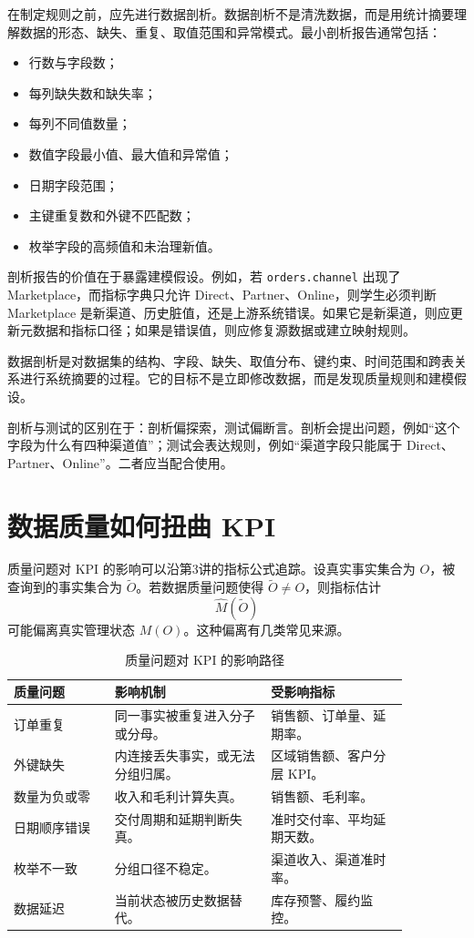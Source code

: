 \documentclass[UTF8,fontset=fandol,openany,zihao=-4]{ctexbook}
\begin{document}
在制定规则之前，应先进行数据剖析。数据剖析不是清洗数据，而是用统计摘要理解数据的形态、缺失、重复、取值范围和异常模式。最小剖析报告通常包括：
\begin{itemize}
  \item 行数与字段数；
  \item 每列缺失数和缺失率；
  \item 每列不同值数量；
  \item 数值字段最小值、最大值和异常值；
  \item 日期字段范围；
  \item 主键重复数和外键不匹配数；
  \item 枚举字段的高频值和未治理新值。
\end{itemize}

剖析报告的价值在于暴露建模假设。例如，若 \texttt{orders.channel} 出现了 Marketplace，而指标字典只允许 Direct、Partner、Online，则学生必须判断 Marketplace 是新渠道、历史脏值，还是上游系统错误。如果它是新渠道，则应更新元数据和指标口径；如果是错误值，则应修复源数据或建立映射规则。

\begin{definition}[数据剖析]
数据剖析是对数据集的结构、字段、缺失、取值分布、键约束、时间范围和跨表关系进行系统摘要的过程。它的目标不是立即修改数据，而是发现质量规则和建模假设。
\end{definition}

剖析与测试的区别在于：剖析偏探索，测试偏断言。剖析会提出问题，例如“这个字段为什么有四种渠道值”；测试会表达规则，例如“渠道字段只能属于 Direct、Partner、Online”。二者应当配合使用。

\section{数据质量如何扭曲 KPI}

质量问题对 KPI 的影响可以沿第3讲的指标公式追踪。设真实事实集合为 \(O\)，被查询到的事实集合为 \(\tilde O\)。若数据质量问题使得 \(\tilde O\ne O\)，则指标估计
\[
\hat M(\tilde O)
\]
可能偏离真实管理状态 \(M(O)\)。这种偏离有几类常见来源。

\begin{table}[htbp]
\centering
\caption{质量问题对 KPI 的影响路径}
\begin{tabular}{>{\raggedright\arraybackslash}p{0.22\linewidth}>{\raggedright\arraybackslash}p{0.34\linewidth}>{\raggedright\arraybackslash}p{0.30\linewidth}}
\toprule
质量问题 & 影响机制 & 受影响指标\\
\midrule
订单重复 & 同一事实被重复进入分子或分母。 & 销售额、订单量、延期率。\\
外键缺失 & 内连接丢失事实，或无法分组归属。 & 区域销售额、客户分层 KPI。\\
数量为负或零 & 收入和毛利计算失真。 & 销售额、毛利率。\\
日期顺序错误 & 交付周期和延期判断失真。 & 准时交付率、平均延期天数。\\
枚举不一致 & 分组口径不稳定。 & 渠道收入、渠道准时率。\\
数据延迟 & 当前状态被历史数据替代。 & 库存预警、履约监控。\\
\bottomrule
\end{tabular}
\end{table}
\end{document}

